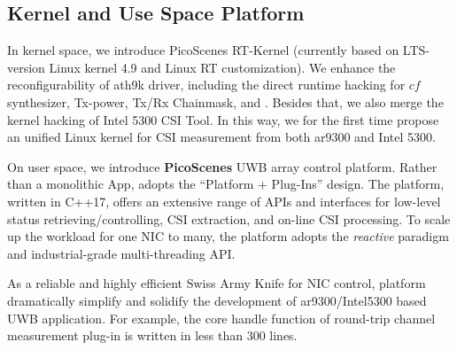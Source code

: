\subsection{Kernel and Use Space Platform} %
\label{sub:picoscenes_platfrom}

In kernel space, we introduce PicoScenes RT-Kernel (currently based on  LTS-version Linux kernel 4.9 and Linux RT customization). We enhance the reconfigurability of ath9k driver, including the direct runtime hacking for $cf$ synthesizer, Tx-power, Tx/Rx Chainmask, and \etc. Besides that, we also merge the kernel hacking of Intel 5300 CSI Tool. In this way, we for the first time propose an unified Linux kernel for CSI measurement from both ar9300 and Intel 5300. 

On user space, we introduce \textbf{PicoScenes} UWB array control platform. Rather than a monolithic App, \ourprotocol adopts the ``Platform + Plug-Ins'' design. The \ourprotocol platform, written in C++17, offers an extensive range of APIs and interfaces for low-level status retrieving/controlling, CSI extraction, and on-line CSI processing. 
To scale up the workload for one NIC to many, 
the platform adopts the \textit{reactive} paradigm and industrial-grade multi-threading API.

As a reliable and highly efficient Swiss Army Knife for NIC control, \ourprotocol platform dramatically simplify and solidify the development of ar9300/Intel5300 based UWB application.
For example, the core handle function of round-trip channel measurement plug-in is written in less than 300 lines.



